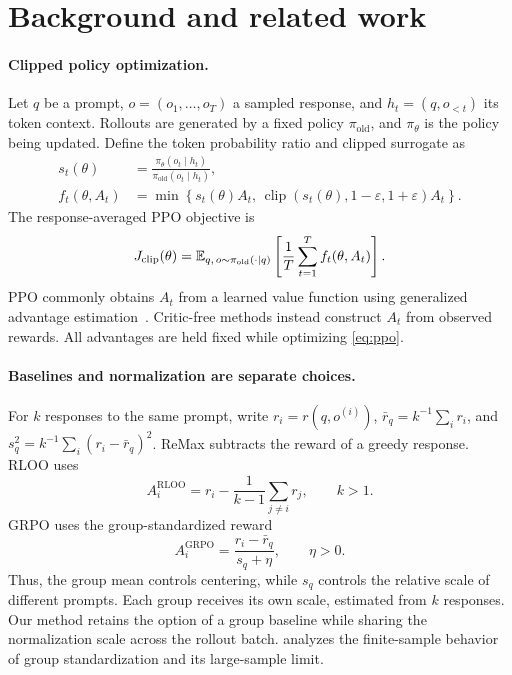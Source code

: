 \section{Background and related work}\label{sec:background}
\paragraph{Clipped policy optimization.}
Let $q$ be a prompt, $o=(o_1,\ldots,o_T)$ a sampled response, and $h_t=(q,o_{<t})$ its token context. Rollouts are generated by a fixed policy $\pi_{\mathrm{old}}$, and $\pi_\theta$ is the policy being updated. Define the token probability ratio and clipped surrogate as
\begin{align}
 s_t(\theta)&=\frac{\pi_\theta(o_t\mid h_t)}{\pi_{\mathrm{old}}(o_t\mid h_t)},\\
 f_t(\theta,A_t)&=\min\!\left\{s_t(\theta)A_t,\,
 \operatorname{clip}(s_t(\theta),1-\varepsilon,1+\varepsilon)A_t\right\}.
 \label{eq:clipped}
\end{align}
The response-averaged PPO objective is
\begin{equation}
 J_{\mathrm{clip}}(\theta)=\mathbb{E}_{q,\,o\sim\pi_{\mathrm{old}}(\cdot\mid q)}
 \left[\frac{1}{T}\sum_{t=1}^{T}f_t(\theta,A_t)\right].
 \label{eq:ppo}
\end{equation}
PPO commonly obtains $A_t$ from a learned value function using generalized advantage estimation~\citep{schulman2018highdimensionalcontinuouscontrolusing}. Critic-free methods instead construct $A_t$ from observed rewards. All advantages are held fixed while optimizing \cref{eq:ppo}.

\paragraph{Baselines and normalization are separate choices.}
For $k$ responses to the same prompt, write $r_i=r(q,o^{(i)})$, $\bar r_q=k^{-1}\sum_i r_i$, and $s_q^2=k^{-1}\sum_i(r_i-\bar r_q)^2$. ReMax subtracts the reward of a greedy response. RLOO uses
\begin{equation}
 A_i^{\mathrm{RLOO}}=r_i-\frac{1}{k-1}\sum_{j\ne i}r_j,
 \qquad k>1.
 \label{eq:rloo}
\end{equation}
GRPO uses the group-standardized reward
\begin{equation}
 A_i^{\mathrm{GRPO}}=\frac{r_i-\bar r_q}{s_q+\eta},
 \qquad \eta>0.
 \label{eq:grpo}
\end{equation}
Thus, the group mean controls centering, while $s_q$ controls the relative scale of different prompts. Each group receives its own scale, estimated from $k$ responses. Our method retains the option of a group baseline while sharing the normalization scale across the rollout batch.  analyzes the finite-sample behavior of group standardization and its large-sample limit.

